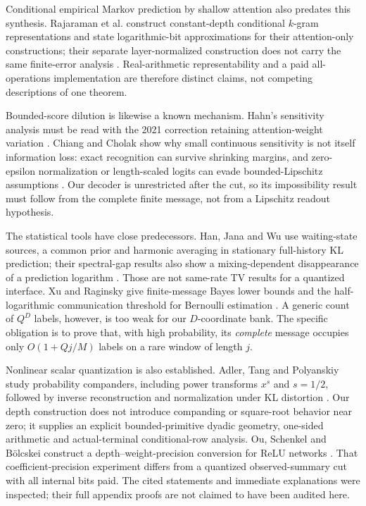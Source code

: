 \documentclass[11pt,letterpaper]{article}
\theoremstyle{definition}\newtheorem{definition}[theorem]{Definition}
\theoremstyle{remark}\newtheorem{remark}[theorem]{Remark}
\begin{document}
Conditional empirical Markov prediction by shallow attention also predates this synthesis. Rajaraman et al. construct constant-depth conditional $k$-gram representations and state logarithmic-bit approximations for their attention-only constructions; their separate layer-normalized construction does not carry the same finite-error analysis \citep[Theorems 4.4 and 5.1; Remarks 4.2 and 5.2]{rajaraman2024}. Real-arithmetic representability and a paid all-operations implementation are therefore distinct claims, not competing descriptions of one theorem.

Bounded-score dilution is likewise a known mechanism. Hahn's sensitivity analysis must be read with the 2021 correction retaining attention-weight variation \citep{hahn2020,hahn2021supp}. Chiang and Cholak show why small continuous sensitivity is not itself information loss: exact recognition can survive shrinking margins, and zero-epsilon normalization or length-scaled logits can evade bounded-Lipschitz assumptions \citep{chiang2022}. Our decoder is unrestricted after the cut, so its impossibility result must follow from the complete finite message, not from a Lipschitz readout hypothesis.

The statistical tools have close predecessors. Han, Jana and Wu use waiting-state sources, a common prior and harmonic averaging in stationary full-history KL prediction; their spectral-gap results also show a mixing-dependent disappearance of a prediction logarithm \citep{han2022}. Those are not same-rate TV results for a quantized interface. Xu and Raginsky give finite-message Bayes lower bounds and the half-logarithmic communication threshold for Bernoulli estimation \citep[Theorem 3 and Example 6]{xu2016}. A generic count of $Q^D$ labels, however, is too weak for our $D$-coordinate bank. The specific obligation is to prove that, with high probability, its \emph{complete} message occupies only $O(1+Qj/M)$ labels on a rare window of length $j$.

Nonlinear scalar quantization is also established. Adler, Tang and Polyanskiy study probability companders, including power transforms $x^s$ and $s=1/2$, followed by inverse reconstruction and normalization under KL distortion \citep[Sections I--III, Theorem 5]{adler2022}. Our depth construction does not introduce companding or square-root behavior near zero; it supplies an explicit bounded-primitive dyadic geometry, one-sided arithmetic and actual-terminal conditional-row analysis. Ou, Schenkel and B\"olcskei construct a depth--weight-precision conversion for ReLU networks \citep[Proposition 4.1]{ou2024}. That coefficient-precision experiment differs from a quantized observed-summary cut with all internal bits paid. The cited statements and immediate explanations were inspected; their full appendix proofs are not claimed to have been audited here.
\end{document}
